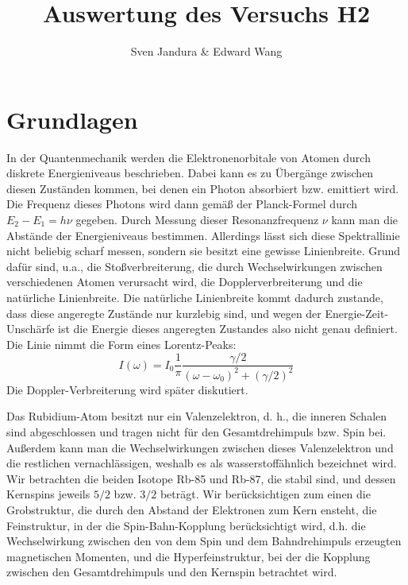 \documentclass[a4paper,parskip]{scrartcl}
\author{Sven Jandura \& Edward Wang}
\title{Auswertung des Versuchs H2}
\begin{document}
\maketitle

\tableofcontents

\section{Grundlagen}

In der Quantenmechanik werden die Elektronenorbitale von Atomen durch diskrete Energieniveaus beschrieben. Dabei kann es zu Übergänge zwischen diesen Zuständen kommen, bei denen ein Photon absorbiert bzw. emittiert wird. Die Frequenz dieses Photons wird dann gemäß der Planck-Formel durch $E_2 - E_1 = h \nu$ gegeben. Durch Messung dieser Resonanzfrequenz $\nu$ kann man die Abstände der Energieniveaus bestimmen. Allerdings lässt sich diese Spektrallinie nicht beliebig scharf messen, sondern sie besitzt eine gewisse Linienbreite. Grund dafür sind, u.a., die Stoßverbreiterung, die durch Wechselwirkungen zwischen verschiedenen Atomen verursacht wird, die Dopplerverbreiterung und die natürliche Linienbreite. Die natürliche Linienbreite kommt dadurch zustande, dass diese angeregte Zustände nur kurzlebig sind, und wegen der Energie-Zeit-Unschärfe ist die Energie dieses angeregten Zustandes also nicht genau definiert. Die Linie nimmt die Form eines Lorentz-Peaks:
\begin{equation*}
    I(\omega) = I_0 \frac{1}{\pi} \frac{\gamma/2}{(\omega - \omega_0)^2 + (\gamma / 2)^2}
\end{equation*}
Die Doppler-Verbreiterung wird später diskutiert.

Das Rubidium-Atom besitzt nur ein Valenzelektron, d. h., die inneren Schalen sind abgeschlossen und tragen nicht für den Gesamtdrehimpuls bzw. Spin bei. Außerdem kann man die Wechselwirkungen zwischen dieses Valenzelektron und die restlichen vernachlässigen, weshalb es als wasserstoffähnlich bezeichnet wird. Wir betrachten die beiden Isotope Rb-85 und Rb-87, die stabil sind, und dessen Kernspins jeweils $5/2$ bzw. $3/2$ beträgt. Wir berücksichtigen zum einen die Grobstruktur, die durch den Abstand der Elektronen zum Kern ensteht, die Feinstruktur, in der die Spin-Bahn-Kopplung berücksichtigt wird, d.h. die Wechselwirkung zwischen den von dem Spin und dem Bahndrehimpuls erzeugten magnetischen Momenten, und die Hyperfeinstruktur, bei der die Kopplung zwischen den Gesamtdrehimpuls und den Kernspin betrachtet wird.
\end{document}
